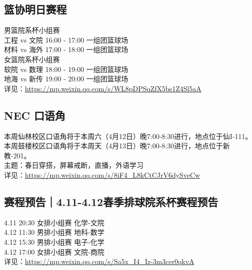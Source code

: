 \documentclass[letterpaper, 12pt]{article}
\begin{document}
\begin{multicols}{2}
\subsection{篮协明日赛程}
男篮院系杯小组赛
\\工程 vs 文院 16:00 - 17:00 一组团篮球场
\\材料 vs 海外 17:00 - 18:00 一组团篮球场
\\女篮院系杯小组赛
\\软院 vs 数理 18:00 - 19:00 一组团篮球场
\\地海 vs 新传 19:00 - 20:00 一组团篮球场
\\详见：\url{https://mp.weixin.qq.com/s/WL8pDPSqZfX5bs1Z4Sl5aA}

\subsection{NEC 口语角}
本周仙林校区口语角将于本周六（4月12日）晚7:00-8:30进行，地点位于仙I-111。
\\本周鼓楼校区口语角将于本周天（4月13日）晚7:00-8:30进行，地点位于新教-201。
\\主题：春日穿搭，屏幕戒断，直播，外语学习
\\详见：\url{https://mp.weixin.qq.com/s/8iF4_L8kCtCJrV6dySveCw}

\subsection{赛程预告｜4.11-4.12春季排球院系杯赛程预告}
4.11 20:30 女排小组赛 化学-文院
\\4.12 11:30 男排小组赛 地科-数学
\\4.12 15:30 男排小组赛 电子-化学
\\4.12 17:00 女排小组赛 文院-商院
\\详见：\url{https://mp.weixin.qq.com/s/Sa5x_I4_Iz-3m3cer0qkvA}
\end{multicols}
\end{document}
